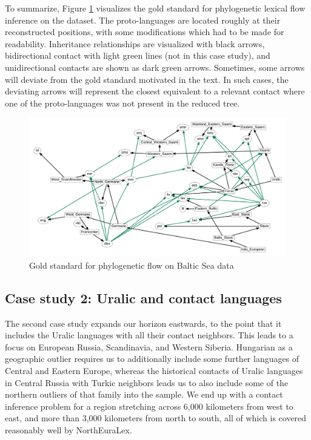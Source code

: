To summarize, Figure \ref{baltic-goldstandard-phylo} visualizes the gold standard for phylogenetic lexical flow inference on the dataset. The proto-languages are located roughly at their reconstructed positions, with some modifications which had to be made for readability. Inheritance relationships are visualized with black arrows, bidirectional contact with light green lines (not in this case study), and unidirectional contacts are shown as dark green arrows. Sometimes, some arrows will deviate from the gold standard motivated in the text. In such cases, the deviating arrows will represent the closest equivalent to a relevant contact where one of the proto-languages was not present in the reduced tree.

\begin{figure}
 \includegraphics[width=\textwidth]{figures/goldstandard-phylo-baltic.pdf}
 \caption{Gold standard for phylogenetic flow on Baltic Sea data}
 \label{baltic-goldstandard-phylo}
\end{figure}

\subsection{Case study 2: Uralic and contact languages}
The second case study expands our horizon eastwards, to the point that it includes the Uralic languages with all their contact neighbors. This leads to a focus on European Russia, Scandinavia, and Western Siberia. Hungarian as a geographic outlier requires us to additionally include some further languages of Central and Eastern Europe, whereas the historical contacts of Uralic languages in Central Russia with Turkic neighbors leads us to also include some of the northern outliers of that family into the sample. We end up with a contact inference problem for a region stretching across 6,000 kilometers from west to east, and more than 3,000 kilometers from north to south, all of which is covered reasonably well by NorthEuraLex.

